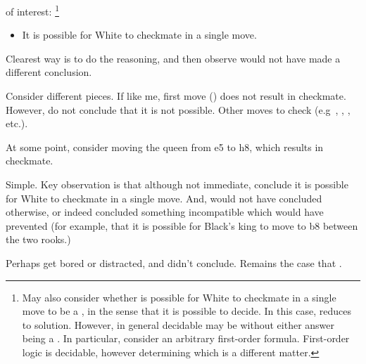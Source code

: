 \begin{note}
   of interest:%
  \footnote{
    May also consider whether is possible for White to checkmate in a single move to be a \fc{}, in the sense that it is possible to decide.
    In this case, reduces to solution.
    However, in general decidable may be \fc{} without either answer being a \fc{}.
    In particular, consider an arbitrary first-order formula.
    First-order logic is decidable, however determining which is a different matter.
  }
  \begin{itemize}
  \item
    It is possible for White to checkmate in a single move.
  \end{itemize}
  Clearest way is to do the reasoning, and then observe would not have made a different conclusion.
\end{note}

\begin{note}
  Consider different pieces.
  If like me, first move () does not result in checkmate.
  However, do not conclude that it is not possible.
  Other moves to check (e.g\ , , , etc.).

  At some point, consider moving the queen from e5 to h8, which results in checkmate.

  Simple.
  Key observation is that although not immediate, conclude it is possible for White to checkmate in a single move.
  And, would not have concluded otherwise, or indeed concluded something incompatible which would have prevented (for example, that it is possible for Black's king to move to b8 between the two rooks.)

  Perhaps get bored or distracted, and didn't conclude.
  Remains the case that \fc{}.
\end{note}

